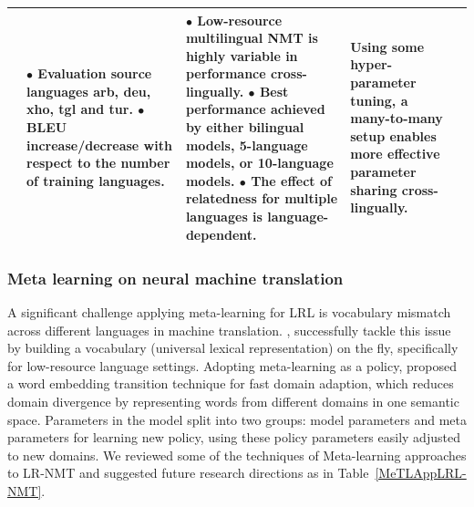 \documentclass[manuscript,screen]{acmart}
\begin{document}
\begin{longtable}{|p{}|p{}|p{}|p{}|p{}|}
& 
    $\bullet$ Evaluation source languages arb, deu, xho, tgl and tur. \newline $\bullet$ BLEU increase/decrease with respect to the number of training languages.
&
    $\bullet$ Low-resource multilingual NMT is highly variable in performance cross-lingually. \newline 
    $\bullet$ Best performance achieved by either bilingual models, 5-language models, or 10-language models. \newline 
    $\bullet$ The effect of relatedness for multiple languages is language-dependent.
&
    Using some hyper-parameter tuning, a many-to-many setup enables more effective parameter sharing cross-lingually.\\ 
 \bottomrule
\end{longtable}


\subsubsection{\bf{Meta learning on neural machine translation}}
A significant challenge applying meta-learning for LRL is vocabulary mismatch across different languages in machine translation. \citet{gu2018universal}, successfully tackle this issue by building a vocabulary (universal lexical representation) on the fly, specifically for low-resource language settings. Adopting meta-learning as a policy, \citet{li2019metamt} proposed a word embedding transition technique for fast domain adaption, which reduces domain divergence by representing words from different domains in one semantic space. Parameters in the model split into two groups: model parameters and meta parameters for learning new policy, using these policy parameters easily adjusted to new domains. We reviewed some of the techniques of Meta-learning approaches to LR-NMT and suggested future research directions as in Table~\ref{MeTLAppLRL-NMT}.
\end{document}
